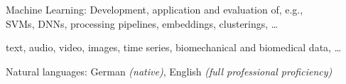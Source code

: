 \documentclass[10pt,a4paper]{article} %
\begin{document}
\vspace{5pt}
\inlineheadsection
{Machine Learning:}
{
        Development, application and evaluation of, e.g.,\\
        SVMs, DNNs, processing pipelines, embeddings, clusterings, \dots
}

\vspace{5pt}
{
       text, audio, video, images, time series, biomechanical and biomedical data, \dots
}



\vspace{5pt}
\inlineheadsection %
{Natural languages:}
{
    German \textit{(native)}, English \textit{(full professional proficiency)}
}


\spacedhrule{1.6em}{-0.4em} %








\end{document}
